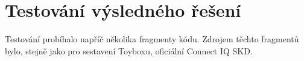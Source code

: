 \chapter{Testování výsledného řešení}
Testování probíhalo napříč několika fragmenty kódu. Zdrojem těchto fragmentů bylo, stejně jako pro sestavení Toyboxu, oficiální Connect IQ SKD.

